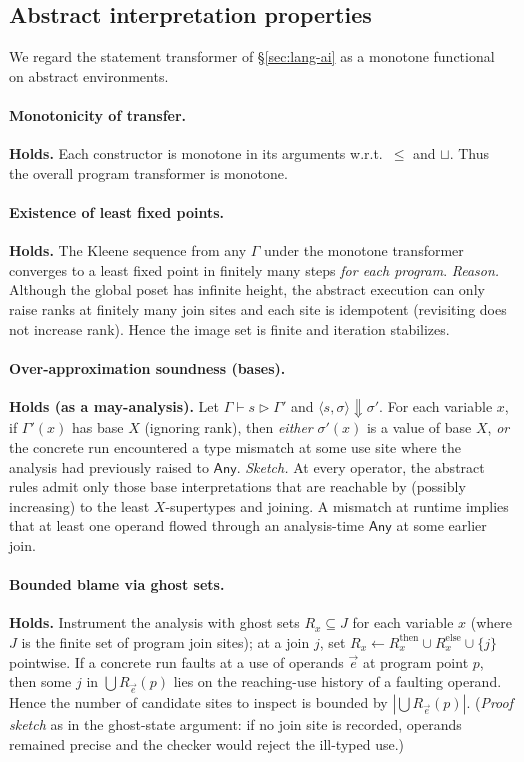 \subsection{Abstract interpretation properties}
We regard the statement transformer of \S\ref{sec:lang-ai} as a monotone functional on abstract environments.

\paragraph{Monotonicity of transfer.}
\textbf{Holds.} Each constructor is monotone in its arguments w.r.t.\ $\le$ and $\sqcup$.
Thus the overall program transformer is monotone.

\paragraph{Existence of least fixed points.}
\textbf{Holds.} The Kleene sequence from any $\Gamma$ under the monotone transformer converges to a least fixed point in finitely many steps \emph{for each program}.
\emph{Reason.} Although the global poset has infinite height, the abstract execution can only raise ranks at finitely many join sites and each site is idempotent (revisiting does not increase rank).
Hence the image set is finite and iteration stabilizes.

\paragraph{Over-approximation soundness (bases).}
\textbf{Holds (as a may-analysis).} 
Let $\Gamma \vdash s \triangleright \Gamma'$ and $\langle s,\sigma\rangle \Downarrow \sigma'$.
For each variable $x$, if $\Gamma'(x)$ has base $X$ (ignoring rank), then \emph{either}
$\sigma'(x)$ is a value of base $X$, \emph{or} the concrete run encountered a type mismatch at some use site where the analysis had previously raised to $\mathsf{Any}$.
\emph{Sketch.} At every operator, the abstract rules admit only those base interpretations that are reachable by (possibly increasing) to the least $X$-supertypes and joining.
A mismatch at runtime implies that at least one operand flowed through an analysis-time $\mathsf{Any}$ at some earlier join.

\paragraph{Bounded blame via ghost sets.}
\textbf{Holds.} Instrument the analysis with ghost sets $R_x\subseteq J$ for each variable $x$ (where $J$ is the finite set of program join sites); at a join $j$, set $R_x \leftarrow R_x^{\mathrm{then}}\cup R_x^{\mathrm{else}}\cup\{j\}$ pointwise.
If a concrete run faults at a use of operands $\vec{e}$ at program point $p$, then some $j$ in $\bigcup R_{\vec{e}}(p)$ lies on the reaching-use history of a faulting operand.
Hence the number of candidate sites to inspect is bounded by $|\bigcup R_{\vec{e}}(p)|$.
(\emph{Proof sketch} as in the ghost-state argument: if no join site is recorded, operands remained precise and the checker would reject the ill-typed use.)

